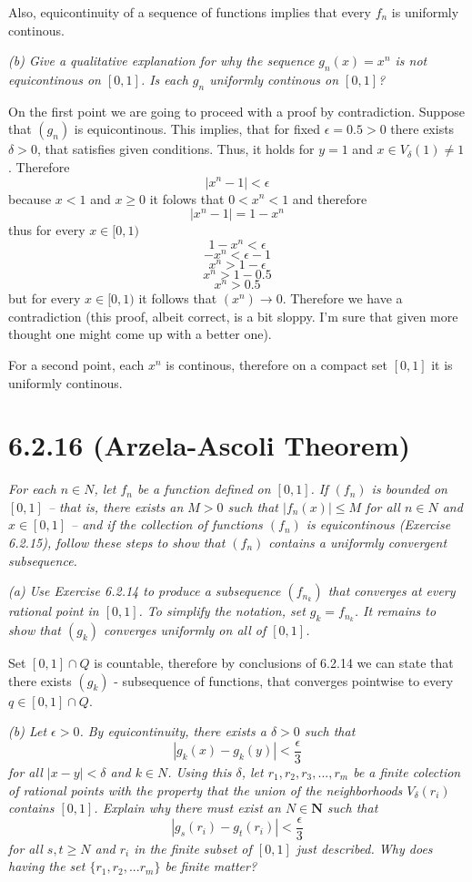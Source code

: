 \documentclass[11pt,oneside,titlepage]{book}
\begin{document}
Also, equicontinuity of a sequence of functions implies that every
$f_n$ is uniformly continous.

\textit{(b) Give a qualitative explanation for why the sequence $g_n(x) = x^n$
  is not equicontinous on $[0, 1]$. Is each $g_n$ uniformly continous on
  $[0, 1]$?}

On the first point we are going to proceed with a proof by contradiction.
Suppose that $(g_n)$ is equicontinous. This implies, that for fixed
$\epsilon = 0.5 > 0$ there exists $\delta > 0$, that
satisfies given conditions.
Thus, it holds for  $y = 1$ and $x \in V_\delta(1) \neq 1$. Therefore
$$|x^n - 1| < \epsilon$$
because $x < 1$ and $x \geq 0$ it folows that $0 < x^n < 1$ and therefore
$$|x^n - 1| = 1 - x^n$$
thus for every $x \in [0, 1)$
$$1 - x^n < \epsilon$$
$$- x^n < \epsilon - 1$$
$$x^n > 1 - \epsilon$$
$$x^n > 1 - 0.5$$
$$x^n > 0.5$$
but for every $x \in [0, 1)$ it follows that $(x^n) \to 0$. Therefore we
have a contradiction (this proof, albeit correct, is a bit sloppy. I'm sure
that given more thought one might come up with a better one).

For a second point, each $x^n$ is continous, therefore on a compact set
$[0, 1]$ it is uniformly continous.

\section*{6.2.16 (Arzela-Ascoli Theorem)}
\textit{For each $n \in N$, let $f_n$ be a function defined on $[0, 1]$. If
  $(f_n)$ is bounded on $[0, 1]$ -- that is, there exists an $M > 0$ such that
  $|f_n(x)| \leq M$ for all $n \in N$ and $x \in [0, 1]$ -- and if the
  collection of functions $(f_n)$ is equicontinous (Exercise 6.2.15),
  follow these steps to show
  that $(f_n)$ contains a uniformly convergent subsequence.}

\textit{(a) Use Exercise 6.2.14 to produce a subsequence $(f_{n_k})$ that
  converges at every rational point in $[0, 1]$. To simplify the notation,
  set $g_k = f_{n_k}$. It remains to show that $(g_k)$ converges uniformly on
  all of $[0, 1]$.}

Set $[0, 1] \cap Q$ is countable, therefore by conclusions of 6.2.14 we
can state that there exists $(g_k)$ - subsequence of functions, that
converges pointwise to every $q \in [0, 1] \cap Q$.

\textit{(b) Let $\epsilon > 0$. By equicontinuity, there exists a
  $\delta > 0$ such that}
$$|g_k(x) - g_k(y)| < \frac{\epsilon}{3}$$
\textit{for all $|x - y| < \delta$ and $k \in N$. Using this $\delta$, let
  $r_1, r_2, r_3, ..., r_m$ be a finite colection of rational points with the
  property that the union of the neighborhoods $V_\delta(r_i)$ contains
  $[0, 1]$. Explain why there must exist an $N \in \textbf{N}$ such that
}
$$|g_s(r_i) - g_t(r_i)| < \frac{\epsilon}{3}$$
\textit{for all $s, t \geq N$ and $r_i$ in the finite subset of $[0, 1]$
  just described. Why does having the set $\{r_1, r_2, ... r_m\}$ be finite
  matter?}
\end{document}
